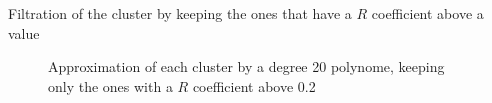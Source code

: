 \begin{frame}{Filtration of the cluster by keeping the ones that have a $R$ coefficient above a value}
    \begin{figure}
        \caption{Approximation of each cluster by a degree 20 polynome, keeping only the ones with a $R$ coefficient above 0.2}
    \end{figure}
\end{frame}